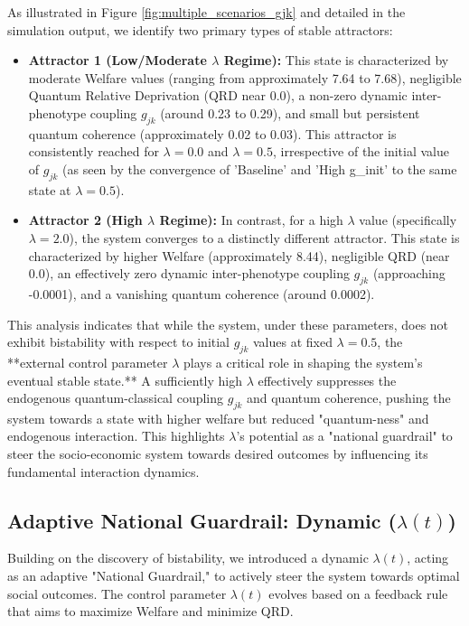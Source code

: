 \documentclass[9pt]{article}
\begin{document}
As illustrated in Figure \ref{fig:multiple_scenarios_gjk} and detailed in the simulation output, we identify two primary types of stable attractors:
\begin{itemize}
    \item \textbf{Attractor 1 (Low/Moderate $\lambda$ Regime):} This state is characterized by moderate Welfare values (ranging from approximately 7.64 to 7.68), negligible Quantum Relative Deprivation (QRD near 0.0), a non-zero dynamic inter-phenotype coupling $g_{jk}$ (around 0.23 to 0.29), and small but persistent quantum coherence (approximately 0.02 to 0.03). This attractor is consistently reached for $\lambda=0.0$ and $\lambda=0.5$, irrespective of the initial value of $g_{jk}$ (as seen by the convergence of 'Baseline' and 'High g\_init' to the same state at $\lambda=0.5$).
    \item \textbf{Attractor 2 (High $\lambda$ Regime):} In contrast, for a high $\lambda$ value (specifically $\lambda=2.0$), the system converges to a distinctly different attractor. This state is characterized by higher Welfare (approximately 8.44), negligible QRD (near 0.0), an effectively zero dynamic inter-phenotype coupling $g_{jk}$ (approaching -0.0001), and a vanishing quantum coherence (around 0.0002).
\end{itemize}
This analysis indicates that while the system, under these parameters, does not exhibit bistability with respect to initial $g_{jk}$ values at fixed $\lambda=0.5$, the **external control parameter $\lambda$ plays a critical role in shaping the system's eventual stable state.** A sufficiently high $\lambda$ effectively suppresses the endogenous quantum-classical coupling $g_{jk}$ and quantum coherence, pushing the system towards a state with higher welfare but reduced "quantum-ness" and endogenous interaction. This highlights $\lambda$'s potential as a "national guardrail" to steer the socio-economic system towards desired outcomes by influencing its fundamental interaction dynamics.

\subsection{Adaptive National Guardrail: Dynamic \texorpdfstring{($\lambda(t)$)}{(lambda(t))}}
Building on the discovery of bistability, we introduced a dynamic $\lambda(t)$, acting as an adaptive "National Guardrail," to actively steer the system towards optimal social outcomes. The control parameter $\lambda(t)$ evolves based on a feedback rule that aims to maximize Welfare and minimize QRD.
\end{document}
